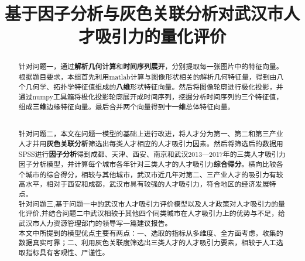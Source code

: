 \documentclass{whutmod}
\title{基于因子分析与灰色关联分析对武汉市人才吸引力的量化评价}
\begin{document}
	
	\begin{abstract}


针对问题一，通过\textbf{解析几何计算}和\textbf{时间序列展开}，分别提取每一张图片中的特征向量。根据题目要求，本组首先利用matlab计算与图像形状相关的解析几何特征量，得到由八个几何学、拓扑学特征值组成的\textbf{八维}形状特征向量。然后将图像轮廓进行极化投影，并通过numpy工具箱将极化投影轮廓展开成时间序列，挖掘分析时间序列的三个特征值，组成\textbf{三维}边缘特征向量。最后合并两个向量得到\textbf{十一维}总体特征向量。


~\\

针对问题二，本文在问题一模型的基础上进行改进，将人才分为第一、第二和第三产业人才并用\textbf{灰色关联分析}筛选出每类人才相应的人才吸引力因素。然后将筛选后的数据用SPSS进行\textbf{因子分析}得到成都、天津、西安、南京和武汉2013—2017年的三类人才吸引力因子分析模型，并计算每个城市各年针对三类人才的人才吸引力\textbf{综合得分}。横向比较各个城市的综合得分，相较与其他城市，武汉市近几年对第二、三产业人才的吸引力有较高水平，相对于西安和成都，武汉市具有较强的人才吸引力，符合地区的经济发展特点。
~\\

针对问题三,基于问题一中的武汉市人才吸引力评价模型以及人才政策对人才吸引力的量化评价,并结合问题二中武汉相较于其他四个同类城市在人才吸引力上的优势与不足，给武汉市人力资源管理部门的领导写一篇建议报告。
~\\

本文中所提到的模型优点主要有两点：一、选取的指标从多维度、全方面考虑，收集的数据真实可靠；二、利用灰色关联度筛选出三类人才的人才吸引力要素，相较于人工选取指标具有客观性、严谨性。
  
		
	\end{abstract}
	
	\tableofcontents
	\newpage	%
	
\end{document}
